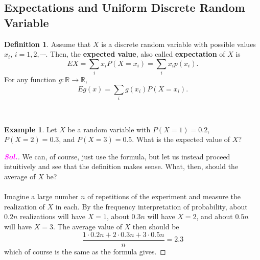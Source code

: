 \documentclass[12pt,a4paper]{article}
\theoremstyle{definition}
\newtheorem{example}{Example}[section]
\theoremstyle{definition}
\newtheorem*{definition}{Definition}
\theoremstyle{definition}
\theoremstyle{definition}
\theoremstyle{remark}
\theoremstyle{definition}
\newcommand{\sol}{\textcolor{magenta}{\bf \textit{Sol.}}\quad}
\begin{document}
\subsection{Expectations and Uniform Discrete Random Variable}
\begin{tcolorbox}[colback=white]
	\begin{definition}
		Assume that $X$ is a discrete random variable with possible values $x_i$, $i=1,2,\cdots$. Then, the \textbf{expected value}, also called \textbf{expectation} of $X$ is \[
		EX=\sum_{i}x_iP(X=x_i)=\sum_{i}x_ip(x_i).
		\] For any function $g:\mathbb{R}\to\mathbb{R}$, \[
		Eg(x)=\sum_{i}g(x_i)P(X=x_i).
		\]
	\end{definition}
\end{tcolorbox}
\
\begin{example}
	Let $X$ be a random variable with $P(X=1)=0.2$, $P(X=2)=0.3$, and $P(X=3)=0.5$. What is the expected value of $X$?\begin{proof}[\sol]
		We can, of course, just use the formula, but let us instead proceed intuitively and see that the definition makes sense. What, then, should the average of $X$ be?\\
		\\
		Imagine a large number $n$ of repetitions of the experiment and measure the realization of $X$ in each. By the frequency interpretation of probability, about $0.2n$ realizations will have $X=1$, about $0.3n$ will have $X=2$, and about $0.5n$ will have $X=3$. The average value of $X$ then should be \[
		\frac{1\cdot0.2n+2\cdot0.3n+3\cdot0.5n}{n}=2.3
		\] which of course is the same as the formula gives.
	\end{proof}
\end{example}
\
\end{document}
